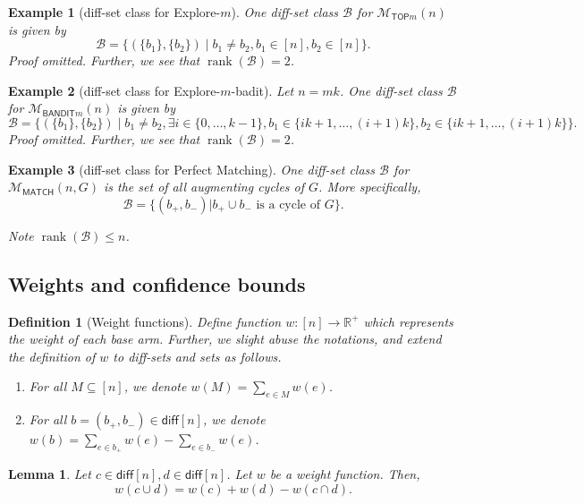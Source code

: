 \documentclass{article}
\newtheorem{define}{Definition}
\newtheorem{example}{Example}
\newtheorem{lemma}{Lemma}
\newcommand{\mmatch}{\mathcal M_{\mathsf{MATCH}}}
\newcommand{\mtop}{\mathcal M_{\mathsf{TOP}m}}
\newcommand{\mbandit}{\mathcal M_{\mathsf{BANDIT}m}}
\newcommand{\diff}{\mathsf{diff}}
\newcommand{\B}{\mathcal B}
\newcommand{\RR}{\mathbb R}
\DeclareMathOperator{\rank}{rank}
\begin{document}
\begin{spacing}{1.1}
\begin{example}[diff-set class for Explore-$m$]
One diff-set class $\B$ for $\mtop(n)$ is given by
$$
\B=\{(\{b_1\},\{b_2\}) \;|\; b_1\not=b_2, b_1\in[n], b_2\in[n]\}.
$$
Proof omitted.
Further, we see that $\rank(\B)=2$.
\end{example}

\begin{example}[diff-set class for Explore-$m$-badit]
Let $n=mk$.
One diff-set class $\B$ for $\mbandit(n)$ is given by
$$
\B=\{(\{b_1\},\{b_2\}) \;|\; b_1\not=b_2, \exists i\in\{0,\ldots,k-1\}, b_1\in \{ik+1,\ldots, (i+1)k\}, b_2\in\{ik+1,\ldots, (i+1)k\}\}.
$$
Proof omitted.
Further, we see that $\rank(\B)=2$.
\end{example}


\begin{example}[diff-set class for Perfect Matching]
One diff-set class $\B$ for $\mmatch(n, G)$ is the set of all augmenting cycles of $G$. 
More specifically,
$$
\B=\{(b_+,b_-) | b_+\cup b_- \text{ is a cycle of } G\}.
$$

Note $\rank(\B)\le n$.
\end{example}

\subsection{Weights and confidence bounds}

\begin{define}[Weight functions]
Define function $w: [n] \rightarrow \RR^+$ which represents the weight of each base arm. 
Further, we slight abuse the notations, and extend the definition of $w$ to diff-sets and sets as follows.
\begin{enumerate}
\item For all $M \subseteq [n]$, we denote $w(M) = \sum_{e\in M} w(e)$.
\item For all $b=(b_+,b_-) \in \diff[n]$, we denote $w(b) = \sum_{e\in b_+} w(e)-\sum_{e\in b_-}w(e)$.
\end{enumerate}
\end{define}


\begin{lemma}
\label{lemma:weight-diff-simple}
Let $c\in \diff[n],d\in \diff[n]$. Let $w$ be a weight function.
Then,
\begin{equation}
w(c\cup d) = w(c)+w(d)-w(c\cap d).
\end{equation}
\end{lemma}


\end{spacing}
\end{document}
